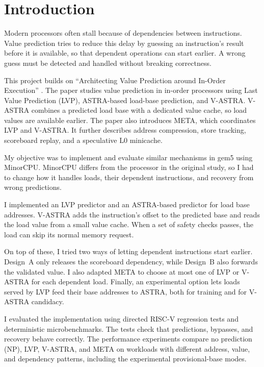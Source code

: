 \section{Introduction}

Modern processors often stall because of dependencies between
instructions. Value prediction tries to reduce
this delay by guessing an instruction's result before it is
available, so that dependent operations can start earlier. A wrong
guess must be detected and handled without breaking correctness.

This project builds on
``Architecting Value Prediction around In-Order Execution''
\cite{ravenel2025architecting}. The paper studies value prediction in
in-order processors using Last Value Prediction (LVP), ASTRA-based
load-base prediction, and V-ASTRA. V-ASTRA combines a predicted load
base with a dedicated value cache, so load values are available
earlier. The paper also introduces META, which coordinates LVP and
V-ASTRA. It further describes address compression, store tracking,
scoreboard replay, and a speculative L0 minicache.

My objective was to implement and evaluate similar mechanisms in
gem5 using MinorCPU. MinorCPU differs from the processor in the
original study, so I had to change how it handles loads, their
dependent instructions, and recovery from wrong predictions.

I implemented an LVP predictor and an ASTRA-based predictor for load
base addresses. V-ASTRA adds the instruction's offset to the predicted
base and reads the load value from a small value cache. When a set of
safety checks passes, the load can skip its normal memory request.

On top of these, I tried two ways of letting dependent instructions start
earlier. Design~A only releases the scoreboard dependency, while
Design~B also forwards the validated value. I also adapted META to
choose at most one of LVP or V-ASTRA for each dependent load. Finally,
an experimental option lets loads served by LVP feed their base
addresses to ASTRA, both for training and for V-ASTRA candidacy.

I evaluated the implementation using directed RISC-V regression
tests and deterministic microbenchmarks. The tests check that predictions,
bypasses, and recovery behave correctly. The performance experiments
compare no prediction (NP), LVP, V-ASTRA, and META on workloads with
different address, value, and dependency patterns, including the
experimental provisional-base modes.
